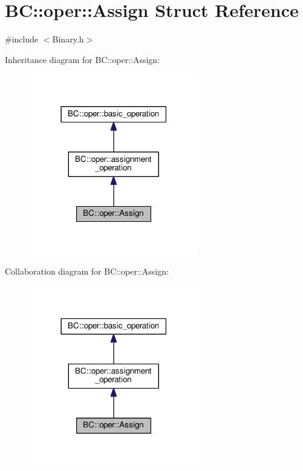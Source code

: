 \hypertarget{structBC_1_1oper_1_1Assign}{}\section{BC\+:\+:oper\+:\+:Assign Struct Reference}
\label{structBC_1_1oper_1_1Assign}


{\ttfamily \#include $<$Binary.\+h$>$}



Inheritance diagram for BC\+:\+:oper\+:\+:Assign\+:
\nopagebreak
\begin{figure}[H]
\begin{center}
\leavevmode
\includegraphics[width=210pt]{structBC_1_1oper_1_1Assign__inherit__graph}
\end{center}
\end{figure}


Collaboration diagram for BC\+:\+:oper\+:\+:Assign\+:
\nopagebreak
\begin{figure}[H]
\begin{center}
\leavevmode
\includegraphics[width=210pt]{structBC_1_1oper_1_1Assign__coll__graph}
\end{center}
\end{figure}
